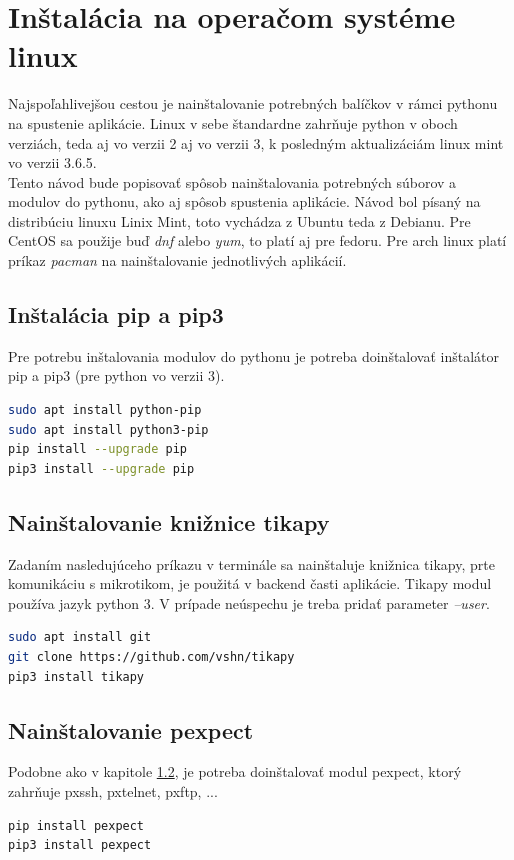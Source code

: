\section{Inštalácia na operačom systéme linux}
Najspoľahlivejšou cestou je nainštalovanie potrebných balíčkov v rámci pythonu na spustenie aplikácie. Linux v sebe štandardne zahrňuje python v oboch verziách, teda aj vo verzii 2 aj vo verzii 3, k posledným aktualizáciám linux mint vo verzii 3.6.5. \\
Tento návod bude popisovať spôsob nainštalovania potrebných súborov a modulov do pythonu, ako aj spôsob spustenia aplikácie. Návod bol písaný na distribúciu linuxu Linix Mint, toto vychádza z Ubuntu teda z Debianu. Pre CentOS sa použije buď \textit{dnf} alebo \textit{yum}, to platí aj pre  fedoru. Pre arch linux platí príkaz \textit{pacman} na nainštalovanie jednotlivých aplikácií. 
\subsection{Inštalácia pip a pip3}
Pre potrebu inštalovania modulov do pythonu je potreba doinštalovať inštalátor pip a pip3 (pre python vo verzii 3).
\begin{lstlisting}[language=bash, frame=single, caption=Nainštalovanie pip,captionpos=b, showstringspaces=false, basicstyle=\footnotesize]
sudo apt install python-pip
sudo apt install python3-pip
pip install --upgrade pip
pip3 install --upgrade pip
\end{lstlisting}
\subsection{Nainštalovanie knižnice tikapy}
\label{sec:tikapy}
Zadaním nasledujúceho príkazu v terminále sa nainštaluje knižnica tikapy, prte komunikáciu s mikrotikom, je použitá v backend časti aplikácie. Tikapy modul používa jazyk python 3. V prípade neúspechu je treba pridať parameter \textit{--user}.
\begin{lstlisting}[language=bash, frame=single, caption=Nainštalovanie tikapy,captionpos=b, showstringspaces=false, basicstyle=\footnotesize]
sudo apt install git
git clone https://github.com/vshn/tikapy
pip3 install tikapy
\end{lstlisting}
\subsection{Nainštalovanie pexpect}
Podobne ako v kapitole \ref{sec:tikapy}, je potreba doinštalovať modul pexpect, ktorý zahrňuje pxssh, pxtelnet, pxftp, ...
\begin{lstlisting}[language=bash, frame=single, caption=Nainštalovanie pexpect,captionpos=b, showstringspaces=false, basicstyle=\footnotesize]
pip install pexpect
pip3 install pexpect
\end{lstlisting}
